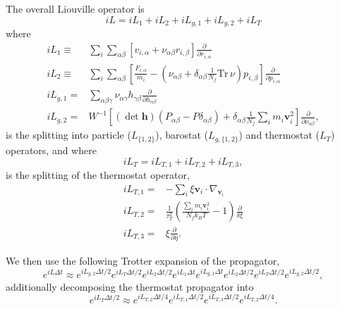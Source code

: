 \documentclass[12pt,letter]{article}
\renewcommand{\vec}[1]{\mathbf{#1}}
\begin{document}
The overall Liouville operator is
\begin{equation}
iL = i L_1 + i L_2 + iL_{g,1} + i L_{g,2} + i L_{T}
\end{equation}
where
\begin{align}
i L_1 \equiv& \sum_i \sum_{\alpha\beta} \left[v_{i,\alpha} + \nu_{\alpha\beta} r_{i,\beta}\right] \frac{\partial}{\partial r_{i,\alpha}}\\
i L_2 \equiv& \sum_i \sum_{\alpha\beta} \left[\frac{F_{i,\alpha}}{m_i} - \left (\nu_{\alpha\beta} +\delta_{\alpha\beta}  \frac{1}{N_f} \mathrm{Tr}\, \nu \right) p_{i,\beta}\right] \frac{\partial}{\partial p_{i,\alpha}}\\
i L_{g,1} =& \sum_{\alpha\beta\gamma} \nu_{\alpha\gamma} h_{\gamma \beta} \frac{\partial}{\partial h_{\alpha\beta}}\\
i L_{g,2} =& W^{-1} \left[(\det\vec h) \left( P_{\alpha \beta} - P\delta_{\alpha\beta}\right) +
\delta_{\alpha\beta} \frac{1}{N_f} \sum_i m_i \vec v_i^2\right] \frac{\partial}{\partial \nu_{\alpha\beta}},\label{eq:NPT_iL_g2}
\end{align}
is the splitting into particle ($L_{\{1,2\}}$), barostat ($L_{g,\{1,2\}}$)
and thermostat ($L_T$) operators, and where
\begin{equation}
i L_{T} = i L_{T,1} + i L_{T,2} + i L_{T,3},
\end{equation}
is the splitting of the thermostat operator,
\begin{align}
i L_{T,1} =& - \sum_i \xi \vec v_i \cdot \nabla_{\vec v_i}\\
i L_{T,2} =& \frac{1}{\tau_T^2}\left(\frac{\sum_i m_i \vec v_i^2}{N_f k_B T} -1 \right) \frac{\partial}{\delta \xi}\\
i L_{T,3} =& \xi \frac{\partial}{\partial \eta}.
\end{align}

We then use the following Trotter expansion of the propagator,
\begin{equation}
e^{i L \Delta t} \approx e^{i L_{g,2} \Delta t/2} e^{i L_T \Delta t/2} 
e^{i L_2 \Delta t/2} e^{i L_{1} \Delta t} e^{i L_{g,1} \Delta t}
e^{i L_2 \Delta t/2} e^{i L_T \Delta t/2} e^{i L_{g,2} \Delta t/2},
\label{eq:trotter_NPT_1}
\end{equation}
additionally decomposing the thermostat propagator into
\begin{equation}
e^{i L_T \Delta t/2} \approx e^{i L_{T,2} \Delta t/4} e^{i L_{T,1} \Delta t/2}
e^{i L_{T,3} \Delta t/2} e^{i L_{T,2} \Delta t/4}.
\label{eq:trotter_NPT_2}
\end{equation}
\end{document}
